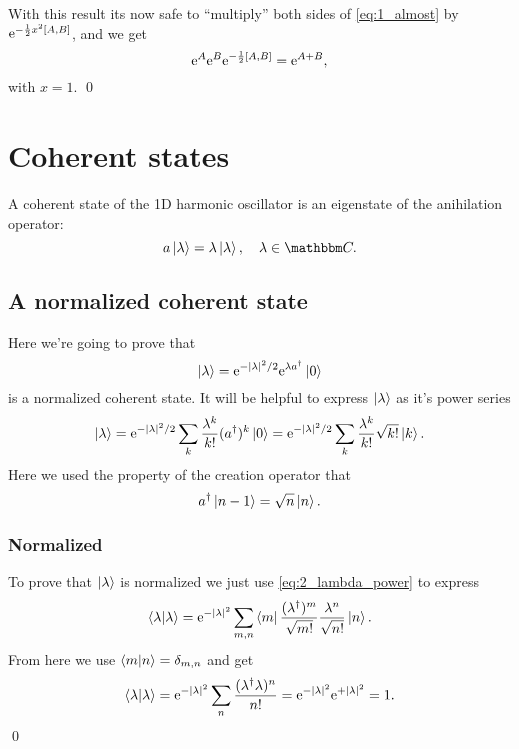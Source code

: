 \documentclass[11pt,letter, swedish, english
]{article}
\begin{document}
With this result its now safe to ``multiply'' both sides of
\eqref{eq:1_almost} by $\ee^{-\frac{1}{2}x^2\comm{A}{B}}$, and we get
\begin{equation}
\ee^{A}\ee^{B}\ee^{-\frac{1}{2}\comm{A}{B}} = \ee^{A+B},
\end{equation}
with $x=1$.
\qed


\section{Coherent states}
A coherent state of the 1D harmonic oscillator is an eigenstate of the
anihilation operator:
\begin{equation}
a\ket{\lambda}=\lambda\ket{\lambda}\qcomma
\lambda\in\C.
\end{equation}

\subsection{A normalized coherent state}
Here we're going to prove that
\begin{equation}\label{eq:2_coherent}
\ket\lambda=\mathrm{e}^{-|\lambda|^2/2}\mathrm{e}^{\lambda a^\dagger}\ket0
\end{equation}
is a normalized coherent state.
It will be helpful to express $\ket\lambda$ as it's power series
\begin{equation}\label{eq:2_lambda_power}
\ket\lambda = \mathrm{e}^{-|\lambda|^2/2}\sum_{k}
\frac{\lambda^k}{k!} (a^\dagger)^k \ket{0}
= \mathrm{e}^{-|\lambda|^2/2}\sum_{k}
\frac{\lambda^k}{k!}\sqrt{k!}\ket{k}.
\end{equation}
Here we used the property of the creation operator that
\begin{equation}
a^\dagger\ket{n-1}=\sqrt{n}\ket{n}.
\end{equation}

\subsubsection{Normalized}
To prove that $\ket\lambda$ is normalized we just use
\eqref{eq:2_lambda_power} to express
\begin{equation}
\ip{\lambda} = \ee^{-|\lambda|^2}\sum_{m, n}
\bra{m}\frac{(\lambda^\dagger)^m}{\sqrt{m!}}
\frac{\lambda^n}{\sqrt{n!}}\ket{n}.
\end{equation}
From here we use $\ip{m}{n}=\delta_{m, n}$ and get
\begin{equation}
\ip{\lambda} = \ee^{-|\lambda|^2}
\sum_n\frac{(\lambda^\dagger\lambda)^n}{n!}
=\ee^{-|\lambda|^2}\ee^{+|\lambda|^2}=1.
\end{equation}
\qed
\end{document}
